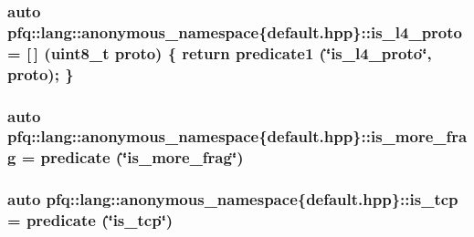 \hypertarget{namespacepfq_1_1lang_1_1anonymous__namespace_02default_8hpp_03_a9d06d4dedca1ebdc3b270cb2f3e9e42b}{
\subsubsection[{is\+\_\+l4\+\_\+proto}]{\setlength{\rightskip}{0pt plus 5cm}auto pfq\+::lang\+::anonymous\+\_\+namespace\{default.\+hpp\}\+::is\+\_\+l4\+\_\+proto = \mbox{[}$\,$\mbox{]} (uint8\+\_\+t proto) \{ return {\bf predicate1} (\char`\"{}is\+\_\+l4\+\_\+proto\char`\"{}, proto); \}}}\label{namespacepfq_1_1lang_1_1anonymous__namespace_02default_8hpp_03_a9d06d4dedca1ebdc3b270cb2f3e9e42b}
\hypertarget{namespacepfq_1_1lang_1_1anonymous__namespace_02default_8hpp_03_a0b169afb2f21c8626f06f77ca75feded}{
\subsubsection[{is\+\_\+more\+\_\+frag}]{\setlength{\rightskip}{0pt plus 5cm}auto pfq\+::lang\+::anonymous\+\_\+namespace\{default.\+hpp\}\+::is\+\_\+more\+\_\+frag = {\bf predicate} (\char`\"{}is\+\_\+more\+\_\+frag\char`\"{})}}\label{namespacepfq_1_1lang_1_1anonymous__namespace_02default_8hpp_03_a0b169afb2f21c8626f06f77ca75feded}
\hypertarget{namespacepfq_1_1lang_1_1anonymous__namespace_02default_8hpp_03_a67fe3072aa5353c1526aa04320d40137}{
\subsubsection[{is\+\_\+tcp}]{\setlength{\rightskip}{0pt plus 5cm}auto pfq\+::lang\+::anonymous\+\_\+namespace\{default.\+hpp\}\+::is\+\_\+tcp = {\bf predicate} (\char`\"{}is\+\_\+tcp\char`\"{})}}\label{namespacepfq_1_1lang_1_1anonymous__namespace_02default_8hpp_03_a67fe3072aa5353c1526aa04320d40137}
